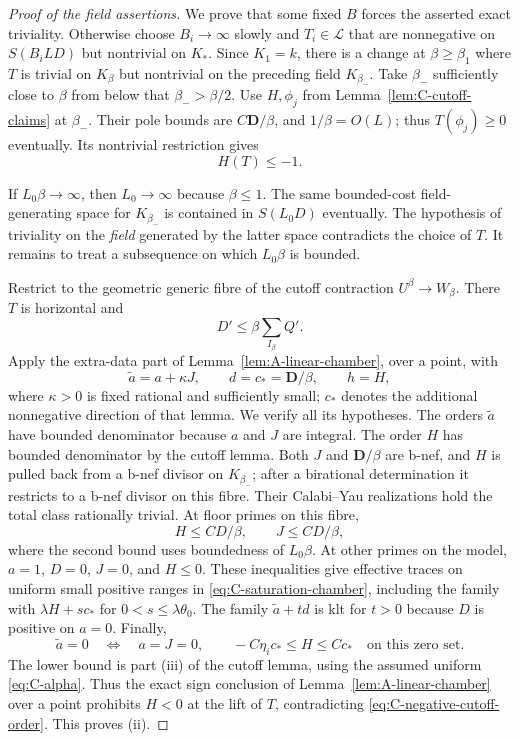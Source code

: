 \begin{proof}[Proof of the field assertions]
We prove that some fixed $B$ forces the asserted exact triviality.
Otherwise choose $B_i\to\infty$ slowly and $T_i\in\mathcal L$ that
are nonnegative on $S(B_iLD)$ but nontrivial on $K_*$.  Since $K_1=k$,
there is a change at $\beta\geq\beta_1$ where $T$ is trivial on
$K_\beta$ but nontrivial on the preceding field $K_{\beta_-}$.
Take $\beta_-$ sufficiently close to $\beta$ from below that
$\beta_->\beta/2$.  Use $H,\phi_j$ from
Lemma~\ref{lem:C-cutoff-claims} at $\beta_-$.  Their pole bounds are
$C\mathbf D/\beta$, and $1/\beta=O(L)$; thus $T(\phi_j)\geq0$
eventually.  Its nontrivial restriction gives
\begin{equation}\label{eq:C-negative-cutoff-order}
                                  H(T)\leq-1.
\end{equation}

If $L_0\beta\to\infty$, then $L_0\to\infty$ because $\beta\leq1$.
The same bounded-cost field-generating space for $K_{\beta_-}$ is
contained in $S(L_0D)$ eventually.  The hypothesis of triviality on the
\emph{field} generated by the latter space contradicts the choice of
$T$.  It remains to treat a subsequence on which $L_0\beta$ is
bounded.

Restrict to the geometric generic fibre of the cutoff contraction
$U^\beta\to W_\beta$.  There $T$ is horizontal and
\[
                     D'\leq\beta\sum_{I_\beta}Q'.
\]
Apply the extra-data part of Lemma~\ref{lem:A-linear-chamber}, over a
point, with
\begin{equation}\label{eq:C-saturation-chamber}
 \widetilde a=a+\kappa J,\qquad
             d=c_* =\mathbf D/\beta,\qquad h=H,
\end{equation}
where $\kappa>0$ is fixed rational and sufficiently small; $c_*$
denotes the additional nonnegative direction of that lemma.
We verify all its hypotheses.  The orders $\widetilde a$ have bounded
denominator because $a$ and $J$ are integral.  The order $H$ has bounded
denominator by the cutoff lemma.  Both $J$ and $\mathbf D/\beta$ are
b-nef, and $H$ is pulled back from a b-nef divisor on $K_{\beta_-}$;
after a birational determination it restricts to a b-nef divisor on
this fibre.  Their Calabi--Yau realizations hold the total class
rationally trivial.  At floor primes on this fibre,
\[
                    H\leq C D/\beta,\qquad J\leq C D/\beta,
\]
where the second bound uses boundedness of $L_0\beta$.  At other
primes on the model, $a=1$, $D=0$, $J=0$, and $H\leq0$.
These inequalities give effective traces on uniform small positive
ranges in \eqref{eq:C-saturation-chamber}, including the family with
$\lambda H+sc_*$ for $0<s\leq\lambda\theta_0$.
The family $\widetilde a+td$ is klt for $t>0$ because $D$ is positive
on $a=0$.  Finally,
\[
 \widetilde a=0\quad\Longleftrightarrow\quad a=J=0,
 \qquad -C\eta_i c_*\leq H\leq Cc_*
                       \quad\text{on this zero set}.
\]
The lower bound is part (iii) of the cutoff lemma, using the assumed
uniform \eqref{eq:C-alpha}.  Thus the exact sign conclusion of
Lemma~\ref{lem:A-linear-chamber} over a point prohibits $H<0$ at the
lift of $T$, contradicting \eqref{eq:C-negative-cutoff-order}.
This proves (ii).


\end{proof}
